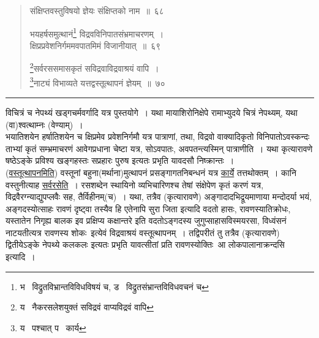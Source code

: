 \documentclass[11pt, openany]{book}
\begin{document}
\begin{quote}
{\na संक्षिप्तवस्तुविषयो ज्ञेयः संक्षिप्तको नाम~॥~६८

भयहर्षसमुत्थानं\renewcommand{\thefootnote}{1}\footnote{भ \textendash\ विद्रुतविभ्रान्तविविधविषयं च, ड \textendash\ विद्रुतसंभ्रान्तविविधवचनं च} विद्रवविनिपातसंभ्रमाचरणम्~।\\
क्षिप्रप्रवेशनिर्गममवपातमिमं विजानीयात्~॥~६९

\renewcommand{\thefootnote}{2}\footnote{य \textendash\ नैकरसलेशयुक्तं सविद्रवं वाप्यविद्रवं वापि}सर्वरससमासकृतं सविद्रवाविद्रवाश्रयं वापि~।\\
\renewcommand{\thefootnote}{3}\footnote{य \textendash\ पश्चात् प \textendash\ कार्य}नाट्यं विभाव्यते यत्तद्वस्तूत्थापनं ज्ञेयम्~॥~७०}
\end{quote}

\hrule

\vspace{2mm}
\noindent
विचित्रं च नेपथ्यं खड्गचर्मवर्गादि यत्र पुस्तयोगे~। यथा मायाशिरोनिक्षेपे रामाभ्युदये चित्रं नेपथ्यम्, यथा (वा)श्वत्थाम्नः (वेण्याम्)~।\\

भयातिशयेन हर्षातिशयेन च क्षिप्रमेव प्रवेशनिर्गमौ यत्र पात्राणां, तथा, विद्रवो वाक्यादिकृतो विनिपातोऽवस्कन्दः ताभ्यां कृतं सम्भ्रमाचरणं आवेगप्रधाना चेष्टा यत्र, सोऽवपातः, अवपतन्त्यस्मिन् पात्राणीति~। यथा कृत्यारावणे षष्ठेऽङ्के {\qt प्रविश्य खङ्गहस्तः सप्रहारः पुरुष} इत्यतः प्रभृति यावदसौ निष्क्रान्तः~।\\

(\underline{वस्तूत्थापनमिति}) वस्तूनां बहुना(मर्थाना)मुत्थापनं प्रसङ्गागतनिबन्धनं यत्र \underline{कार्ये} तत्तथोक्तम्~। कानि वस्तुनीत्याह \underline{सर्वरसेति}~। रसशब्देन स्थायिनो व्यभिचारिणश्च तेषां संक्षेपेण कृतं करणं यत्र, विद्रवैरग्न्याद्युपप्लवैः सह, तैर्विहीनम्(च)~। यथा, तत्रैव (कृत्यारावणे) अङ्गादादभिद्रूयमाणाया मन्दोदर्या भयं, अङ्गदस्योत्साहः रावणं दृष्ट्वा तस्यैव हि {\qt एतेनापि सुरा जिता} इत्यादि वदतो हासः, रावणस्यातिक्रोधः, {\qt यस्तातेन निगृह्य बालक इव प्रक्षिप्य कक्षान्तरे} इति वदतोऽङ्गदस्य जुगुप्साहासविस्मयरसा, विध्वंसनं नाटयतीत्यत्र रावणस्य शोकः\textendash\ इत्येवं विद्रवाश्रयं वस्तूत्थापनम्~। तद्विपरीतं तु तत्रैव (कृत्यारावणे) द्वितीयेऽङ्के {\qt नेपथ्ये कलकलः} इत्यतः प्रभृति यावत्सीतां प्रति रावणस्योक्तिः\textendash\ {\qt आ लोकपालानाक्रन्दसि} इत्यादि~।

\newpage
\end{document}
